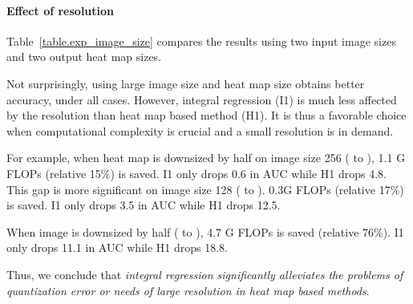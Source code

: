 \documentclass[runningheads]{llncs}
\begin{document}
\paragraph{\textbf{Effect of resolution}}
Table~\ref{table.exp_image_size} compares the results using two input image sizes and two output heat map sizes.

Not surprisingly, using large image size and heat map size obtains better accuracy, under all cases. However, integral regression (I1) is much less affected by the resolution than heat map based method (H1). It is thus a favorable choice when computational complexity is crucial and a small resolution is in demand.

For example, when heat map is downsized by half on image size 256 ( to ), 1.1 G FLOPs (relative 15\%) is saved. I1 only drops 0.6 in AUC while H1 drops 4.8. This gap is more significant on image size 128 ( to ). 0.3G FLOPs (relative 17\%) is saved. I1 only drops 3.5 in AUC while H1 drops 12.5.

When image is downsized by half ( to ), 4.7 G FLOPs is saved (relative 76\%). I1 only drops 11.1 in AUC while H1 drops 18.8.

Thus, we conclude that \emph{integral regression significantly alleviates the problems of quantization error or needs of large resolution in heat map based methods}.

\begin{table}[t]
\caption{For two methods (H1/I1), two input imagefeature map () resolutions, and two heat map sizes (using either 3 or 2 upsampling layers), the performance metric (mAP@0.5, map@0.1, AUC), the computation (in FLOPs) and the amount of network parameters. Note that setting  is used in all other experiments}
\begin{center}
\end{center}
\label{table.exp_image_size}
\end{table}
\end{document}
